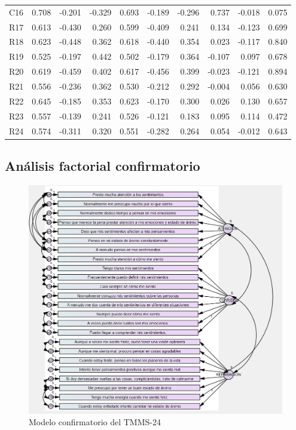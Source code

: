 \documentclass[
  10pt,
  spanish,
]{article}
\begin{document}
\begin{table}[H]
\begin{tabular}[t]{lrrrrrrrrr}
C16 & 0.708 & -0.201 & -0.329 & 0.693 & -0.189 & -0.296 & 0.737 & -0.018 & 0.075\\
\addlinespace
R17 & 0.613 & -0.430 & 0.260 & 0.599 & -0.409 & 0.241 & 0.134 & -0.123 & 0.699\\
R18 & 0.623 & -0.448 & 0.362 & 0.618 & -0.440 & 0.354 & 0.023 & -0.117 & 0.840\\
R19 & 0.525 & -0.197 & 0.442 & 0.502 & -0.179 & 0.364 & -0.107 & 0.097 & 0.678\\
R20 & 0.619 & -0.459 & 0.402 & 0.617 & -0.456 & 0.399 & -0.023 & -0.121 & 0.894\\
R21 & 0.556 & -0.236 & 0.362 & 0.530 & -0.212 & 0.292 & -0.004 & 0.056 & 0.630\\
R22 & 0.645 & -0.185 & 0.353 & 0.623 & -0.170 & 0.300 & 0.026 & 0.130 & 0.657\\
R23 & 0.557 & -0.139 & 0.241 & 0.526 & -0.121 & 0.183 & 0.095 & 0.114 & 0.472\\
R24 & 0.574 & -0.311 & 0.320 & 0.551 & -0.282 & 0.264 & 0.054 & -0.012 & 0.643\\
\bottomrule
\end{tabular}
\end{table}

\hypertarget{anuxe1lisis-factorial-confirmatorio}{%
\subsection{Análisis factorial
confirmatorio}\label{anuxe1lisis-factorial-confirmatorio}}

\begin{figure}

{\centering \includegraphics[width=0.8\linewidth]{./mapa_AMOS} 

}

\caption{Modelo confirmatorio del TMMS-24}\label{fig:unnamed-chunk-12}
\end{figure}
\end{document}
